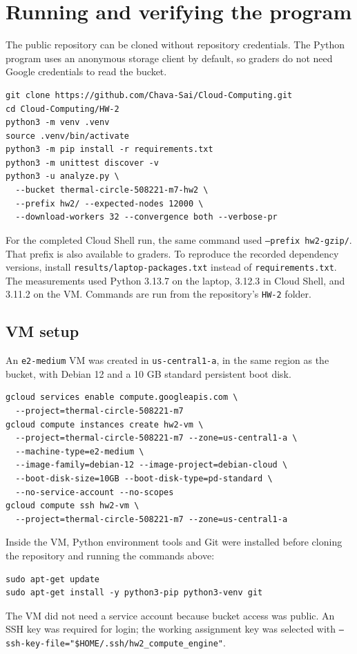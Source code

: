 \documentclass[10pt,letterpaper]{article}
\begin{document}
\section{Running and verifying the program}
The public repository can be cloned without repository credentials. The Python
program uses an anonymous storage client by default, so graders do not need
Google credentials to read the bucket.
\begin{lstlisting}
git clone https://github.com/Chava-Sai/Cloud-Computing.git
cd Cloud-Computing/HW-2
python3 -m venv .venv
source .venv/bin/activate
python3 -m pip install -r requirements.txt
python3 -m unittest discover -v
python3 -u analyze.py \
  --bucket thermal-circle-508221-m7-hw2 \
  --prefix hw2/ --expected-nodes 12000 \
  --download-workers 32 --convergence both --verbose-pr
\end{lstlisting}
For the completed Cloud Shell run, the same command used
\texttt{--prefix hw2-gzip/}. That prefix is also available to graders.
To reproduce the recorded dependency versions, install
\texttt{results/laptop-packages.txt} instead of \texttt{requirements.txt}.
The measurements used Python 3.13.7 on the laptop, 3.12.3 in Cloud Shell, and
3.11.2 on the VM. Commands are run from the repository's \texttt{HW-2} folder.

\subsection{VM setup}
An \texttt{e2-medium} VM was created in \texttt{us-central1-a}, in the same
region as the bucket, with Debian 12 and a 10 GB standard persistent boot disk.
\begin{lstlisting}
gcloud services enable compute.googleapis.com \
  --project=thermal-circle-508221-m7
gcloud compute instances create hw2-vm \
  --project=thermal-circle-508221-m7 --zone=us-central1-a \
  --machine-type=e2-medium \
  --image-family=debian-12 --image-project=debian-cloud \
  --boot-disk-size=10GB --boot-disk-type=pd-standard \
  --no-service-account --no-scopes
gcloud compute ssh hw2-vm \
  --project=thermal-circle-508221-m7 --zone=us-central1-a
\end{lstlisting}
Inside the VM, Python environment tools and Git were installed before cloning
the repository and running the commands above:
\begin{lstlisting}
sudo apt-get update
sudo apt-get install -y python3-pip python3-venv git
\end{lstlisting}
The VM did not need a service account because bucket access was public. An SSH
key was required for login; the working assignment key was selected with
\texttt{--ssh-key-file="\$HOME/.ssh/hw2\_compute\_engine"}.
\end{document}
